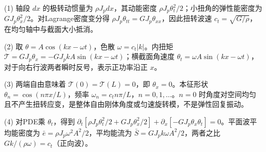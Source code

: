 (1) 轴段 \(dx\) 的极转动惯量为 \(\rho J_pdx\)，其动能密度 \(\rho J_p\theta_t^2/2\)；小扭角的弹性能密度为 \(GJ_p\theta_x^2/2\)。对Lagrange密度变分得 \(\boxed{\rho J_p\theta_{tt}=GJ_p\theta_{xx}}\)，因此扭转波速 \(c_t=\sqrt{G/\rho}\)，在均匀轴中与截面大小抵消。

(2) 取 \(\theta=A\cos(kx-\omega t)\)，色散 \(\omega=c_t|k|\)。内扭矩 \(\mathcal T=GJ_p\theta_x=-GJ_pkA\sin(kx-\omega t)\)；横截面角速度 \(\theta_t=\omega A\sin(kx-\omega t)\)，对于向右行波两者瞬时反号，表示正功率沿正 \(x\)。

(3) 两端自由意味着 \(\mathcal T(0)=\mathcal T(L)=0\)，即 \(\theta_x=0\)。本征形状 \(\theta_n=\cos(n\pi x/L)\)，频率 \(\boxed{\omega_n=c_tn\pi/L}\)，\(n=0,1,\ldots\)。\(n=0\) 时角度对空间均匀且不产生扭转应变，是整体自由刚体角度或匀速旋转模，不是弹性回复振动。

(4) 对PDE乘 \(\theta_t\)，得到 \(\partial_t[\rho J_p\theta_t^2/2+GJ_p\theta_x^2/2]+\partial_x[-GJ_p\theta_x\theta_t]=0\)。平面波平均能密度为 \(\bar e=\rho J_p\omega^2A^2/2\)，平均能流为 \(\bar S=GJ_pk\omega A^2/2\)，两者之比 \(Gk/(\rho\omega)=c_t\)（正向波）。
